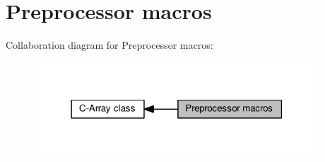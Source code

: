 \section{Preprocessor macros}
\label{group__prep__group}
Collaboration diagram for Preprocessor macros\+:\nopagebreak
\begin{figure}[H]
\begin{center}
\leavevmode
\includegraphics[width=303pt]{group__prep__group}
\end{center}
\end{figure}
